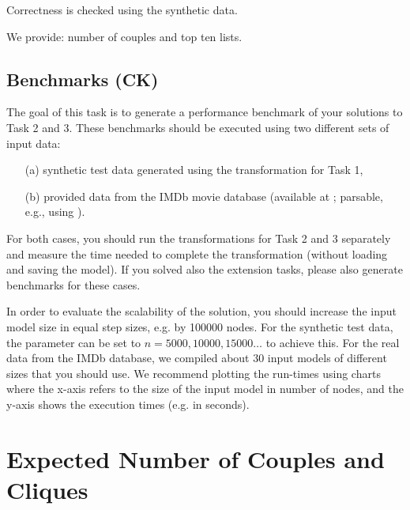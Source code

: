 \documentclass[a4paper,11pt]{article}
\begin{document}
Correctness is checked using the synthetic data.

We provide: number of couples and top ten lists.

\subsection{Benchmarks (CK)}

The goal of this task is to generate a performance benchmark
of your solutions to Task 2 and 3. These benchmarks should be
executed using two different sets of input data:
\begin{enumerate}
\item[(a)] synthetic test data generated using the transformation for Task 1, 
\item[(b)] provided data from the IMDb movie database (available at \cite{IMDBDATA}; parsable, e.g., using \cite{IMDB2EMF}).
\end{enumerate}
For both cases, you should run the transformations for Task 2 and 3
separately and measure the time needed to complete the transformation 
(without loading and saving the model).
If you solved also the extension tasks, please also generate benchmarks
for these cases.


In order to evaluate the scalability of the solution, you should
increase the input model size in equal step sizes, e.g. by 
100000 nodes. For the synthetic test data, the parameter can be
set to $n=5000, 10000, 15000\ldots$ to achieve this. For the
real data from the IMDb database, we compiled about 30 input 
models of different sizes that you should use.
We recommend plotting the run-times using charts where
the x-axis refers to the size of the input model in number of nodes,
and the y-axis shows the execution times (e.g. in seconds).





\appendix



\section{Expected Number of Couples and Cliques}
\label{sec:expected-numbers}
\end{document}
